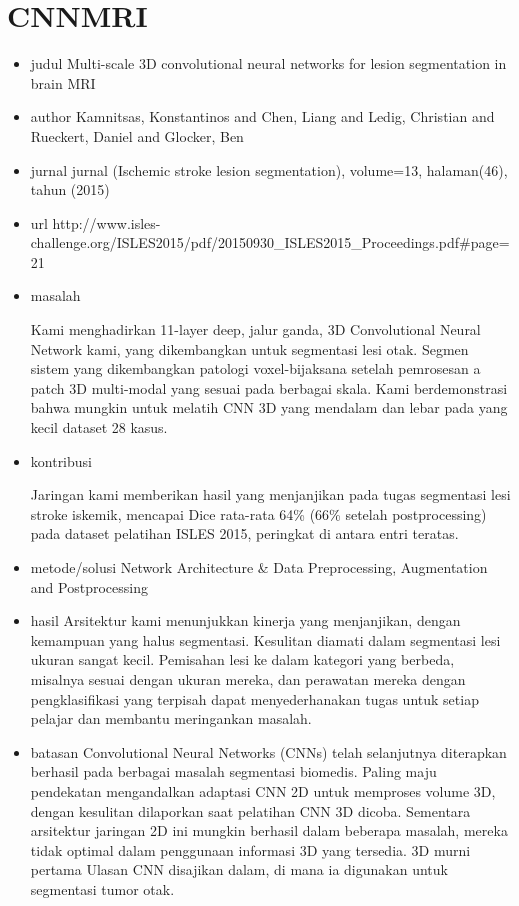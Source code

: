 \section{CNNMRI}
\begin{itemize}

\item judul
Multi-scale 3D convolutional neural networks for lesion segmentation in brain MRI

\item author
Kamnitsas, Konstantinos and Chen, Liang and Ledig, Christian and Rueckert, Daniel and Glocker, Ben

\item jurnal
jurnal (Ischemic stroke lesion segmentation), volume=13, halaman(46), tahun (2015)

\item url 
http://www.isles-challenge.org/ISLES2015/pdf/20150930_ISLES2015_Proceedings.pdf#page=21

\item masalah

Kami menghadirkan 11-layer deep, jalur ganda, 3D Convolutional Neural Network kami, yang dikembangkan untuk segmentasi lesi otak.
Segmen sistem yang dikembangkan patologi voxel-bijaksana setelah pemrosesan a
patch 3D multi-modal yang sesuai pada berbagai skala. Kami berdemonstrasi
bahwa mungkin untuk melatih CNN 3D yang mendalam dan lebar pada yang kecil
dataset 28 kasus.

\item kontribusi

Jaringan kami memberikan hasil yang menjanjikan pada tugas
segmentasi lesi stroke iskemik, mencapai Dice rata-rata 64\%
(66\% setelah postprocessing) pada dataset pelatihan ISLES 2015, peringkat di antara entri teratas.

\item metode/solusi
Network Architecture \& Data Preprocessing, Augmentation and Postprocessing

\item hasil
Arsitektur kami menunjukkan kinerja yang menjanjikan, dengan kemampuan yang halus
segmentasi. Kesulitan diamati dalam segmentasi lesi ukuran sangat kecil. Pemisahan lesi ke dalam kategori yang berbeda, misalnya
sesuai dengan ukuran mereka, dan perawatan mereka dengan pengklasifikasi yang terpisah dapat menyederhanakan
tugas untuk setiap pelajar dan membantu meringankan masalah.

\item batasan
Convolutional Neural Networks (CNNs) telah selanjutnya diterapkan
berhasil pada berbagai masalah segmentasi biomedis. Paling maju
pendekatan mengandalkan adaptasi CNN 2D untuk memproses volume 3D, dengan kesulitan dilaporkan saat pelatihan CNN 3D dicoba.
Sementara arsitektur jaringan 2D ini mungkin berhasil dalam beberapa masalah,
mereka tidak optimal dalam penggunaan informasi 3D yang tersedia. 3D murni pertama
Ulasan CNN disajikan dalam, di mana ia digunakan untuk segmentasi tumor otak.
\end{itemize}